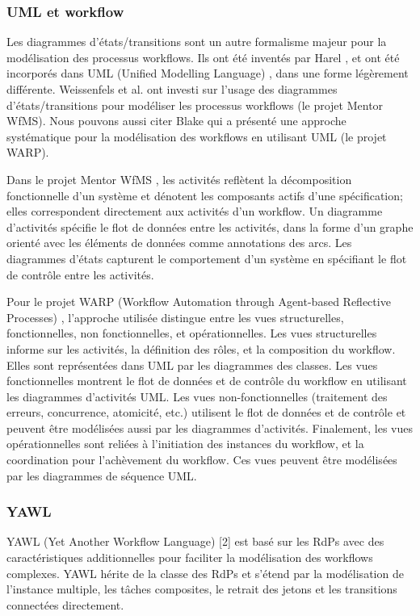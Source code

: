 \subsubsection{UML et workflow}


Les diagrammes d'états/transitions sont un autre formalisme majeur pour la modélisation des processus workflows. Ils ont été inventés par Harel \parencite{Harel}, et ont été incorporés dans UML (Unified Modelling Language)  \parencite{UML}, dans une forme légèrement différente. Weissenfels et al. \parencite{EDBT'98} ont investi sur l'usage des diagrammes d'états/transitions pour modéliser les processus workflows (le projet Mentor WfMS). Nous pouvons aussi citer Blake \parencite{WETICE'02} qui a présenté une approche systématique pour la modélisation des workflows en utilisant UML (le projet WARP). 

Dans le projet Mentor WfMS \parencite{EDBT'98}, les activités reflètent la décomposition fonctionnelle d'un système et dénotent les composants actifs d'une spécification; elles correspondent directement aux activités d'un workflow. Un diagramme d'activités spécifie le flot de données entre les activités, dans la forme d'un graphe orienté avec les éléments de données comme annotations des arcs. Les diagrammes d'états capturent le comportement d'un système en spécifiant le flot de contrôle entre les activités.

Pour le projet WARP (Workflow Automation through Agent-based Reflective Processes) \parencite{WETICE'02}, l'approche utilisée distingue entre les vues structurelles, fonctionnelles, non fonctionnelles, et opérationnelles. Les vues structurelles informe sur les activités, la définition des rôles, et la composition du workflow. Elles sont représentées dans UML par les diagrammes des classes. Les vues fonctionnelles montrent le flot de données et de contrôle du workflow en utilisant les diagrammes d'activités UML. Les vues non-fonctionnelles (traitement des erreurs, concurrence, atomicité, etc.) utilisent le flot de données et de contrôle et peuvent être modélisées aussi par les diagrammes d'activités. Finalement, les vues opérationnelles sont reliées à l'initiation des instances du workflow, et la coordination pour l'achèvement du workflow. Ces vues peuvent être modélisées par les diagrammes de séquence UML.

\subsubsection{YAWL}
YAWL (Yet Another Workflow Language) [2] est basé sur les RdPs avec des caractéristiques additionnelles pour faciliter la modélisation des workflows complexes. YAWL hérite de la classe des RdPs et s'étend par la modélisation de l'instance multiple, les tâches composites, le retrait des jetons et les transitions connectées directement.

